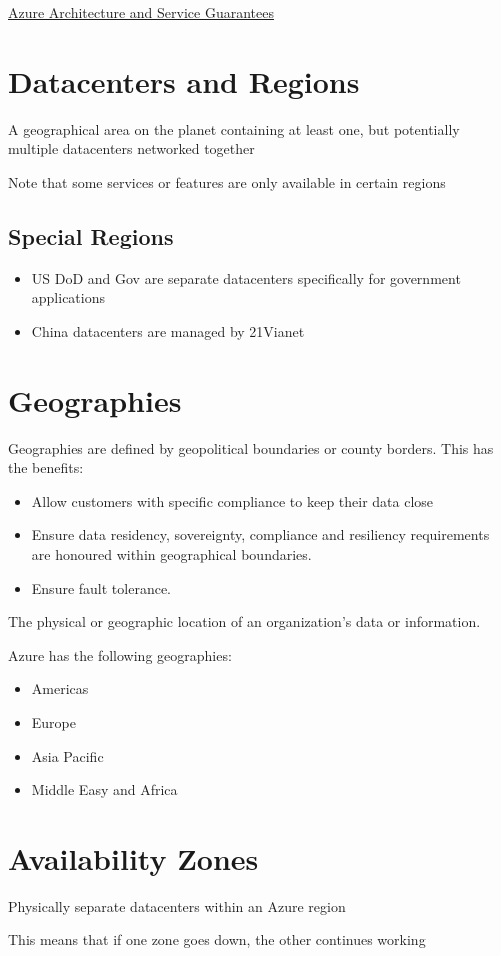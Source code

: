 \documentclass{article}[18pt]
\begin{document}
\begin{center}
\underline{\huge Azure Architecture and Service Guarantees}
\end{center}
\section{Datacenters and Regions}
\begin{definition}[Region]
A geographical area on the planet containing at least one, but potentially multiple datacenters networked together
\end{definition}
Note that some services or features are only available in certain regions
\subsection{Special Regions}
\begin{itemize}
	\item US DoD and Gov are separate datacenters specifically for government applications
	\item China datacenters are managed by 21Vianet
\end{itemize}
\section{Geographies}
Geographies are defined by geopolitical boundaries or county borders. This has the benefits:
\begin{itemize}
	\item Allow customers with specific compliance to keep their data close
	\item Ensure data residency, sovereignty, compliance and resiliency requirements are honoured within geographical boundaries.
	\item Ensure fault tolerance.
\end{itemize}
\begin{definition}
	The physical or geographic location of an organization's data or information.
\end{definition}
Azure has the following geographies:
\begin{itemize}
	\item Americas
	\item Europe
	\item Asia Pacific
	\item Middle Easy and Africa
\end{itemize}
\section{Availability Zones}
\begin{definition}
	Physically separate datacenters within an Azure region
\end{definition}
This means that if one zone goes down, the other continues working
\end{document}
